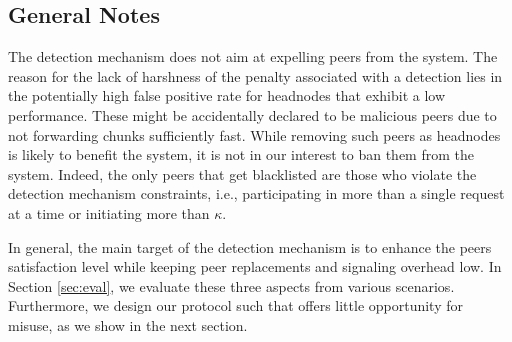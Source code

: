 \subsection{General Notes}
The detection mechanism does not aim at expelling peers from the system.
The reason for the lack of harshness of the penalty associated with a detection lies in the potentially high false positive rate for headnodes that exhibit a low performance. 
These might be accidentally declared to be malicious peers due to not forwarding chunks sufficiently fast. 
While removing such peers as headnodes is likely to benefit the system, it is not in our interest to ban them from the system. 
Indeed, the only peers that get blacklisted are those who violate the detection mechanism constraints, i.e., participating in more than a single request at a time or initiating more than $\kappa$.

In general, the main target of the detection mechanism is to enhance the peers satisfaction level while keeping peer replacements and  
signaling overhead low. In Section \ref{sec:eval}, we evaluate these three aspects from various scenarios. 
Furthermore, we design our protocol such that offers little opportunity for misuse, as we show in the next section. 





